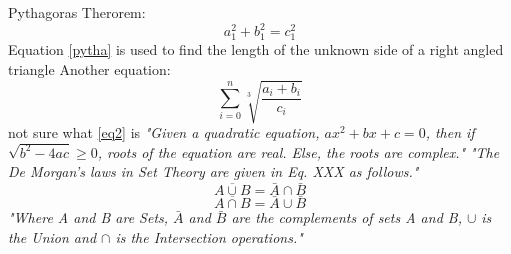 \documentclass{article}
\begin{document}
	Pythagoras Therorem:
	\begin{equation}
		\label{pytha}
		a_1^2 + b_1^2 = c_1^2
	\end{equation}
	Equation \ref{pytha} is used to find the length of the unknown side of a right angled triangle
	\newline
	\newline
	Another equation:
	\begin{equation}
		\label{eq2}
		\sum_{i=0}^{n} \sqrt[3]{\frac{a_i + b_i}{c_i}}
	\end{equation}
	not sure what \ref{eq2} is
	\newline
	\newline
	\textit{"Given a quadratic equation, $ax^2+bx+c=0$, then if $\sqrt{b^2-4ac}\geq0 $, roots of the equation are real. Else, the roots are complex."}
	\newline
	\newline
	\textit{"The De Morgan's laws in Set Theory are given in Eq. XXX as follows."}
	$$\overline{A \cup B} = \bar{A} \cap \bar{B}$$
	$$\overline{A \cap B} = \bar{A} \cup \bar{B} $$
	\textit{"Where A and B are Sets, $\bar{A}$ and $\bar{B}$ are the complements of sets A and B, $\cup$ is the Union and $\cap$ is the Intersection operations."}
\end{document}
